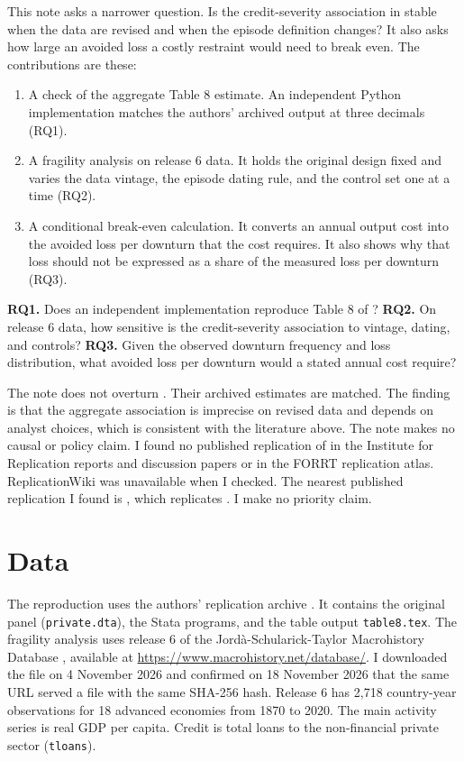 \documentclass[11pt]{article}
\begin{document}
This note asks a narrower question. Is the credit-severity association in \citet{jst2013}
stable when the data are revised and when the episode definition changes? It also asks how
large an avoided loss a costly restraint would need to break even. The contributions are
these:
\begin{enumerate}
\item A check of the aggregate \citet{jst2013} Table 8 estimate. An independent Python
  implementation matches the authors' archived output at three decimals (RQ1).
\item A fragility analysis on release 6 data. It holds the original design fixed and varies
  the data vintage, the episode dating rule, and the control set one at a time (RQ2).
\item A conditional break-even calculation. It converts an annual output cost into the
  avoided loss per downturn that the cost requires. It also shows why that loss should not
  be expressed as a share of the measured loss per downturn (RQ3).
\end{enumerate}
\textbf{RQ1.} Does an independent implementation reproduce Table 8 of \citet{jst2013}?
\textbf{RQ2.} On release 6 data, how sensitive is the credit-severity association to
vintage, dating, and controls? \textbf{RQ3.} Given the observed downturn frequency and loss
distribution, what avoided loss per downturn would a stated annual cost require?

The note does not overturn \citet{jst2013}. Their archived estimates are matched. The finding
is that the aggregate association is imprecise on revised data and depends on analyst
choices, which is consistent with the literature above. The note makes no causal or policy
claim. I found no published replication of \citet{jst2013} in the Institute for Replication
reports and discussion papers or in the FORRT replication atlas. ReplicationWiki was
unavailable when I checked. The nearest published replication I found is
\citet{summers2017}, which replicates \citet{schularicktaylor2012}. I make no priority claim.

\section{Data}
The reproduction uses the authors' replication archive \citep{jstcode}. It contains the
original panel (\texttt{private.dta}), the Stata programs, and the table output
\texttt{table8.tex}. The fragility analysis uses release 6 of the Jord\`a-Schularick-Taylor
Macrohistory Database \citep{jstdatabase}, available at
\url{https://www.macrohistory.net/database/}. I downloaded the file on 4 November 2026 and
confirmed on 18 November 2026 that the same URL served a file with the same SHA-256 hash. Release 6 has 2,718 country-year observations for
18 advanced economies from 1870 to 2020. The main activity series is real GDP per capita.
Credit is total loans to the non-financial private sector (\texttt{tloans}).
\end{document}
